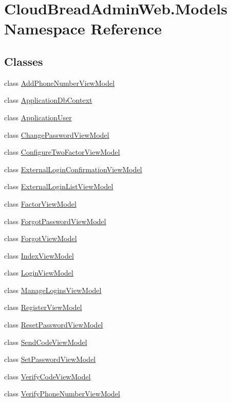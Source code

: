 \hypertarget{a00422}{}\section{Cloud\+Bread\+Admin\+Web.\+Models Namespace Reference}
\label{a00422}
\subsection*{Classes}
\begin{DoxyCompactItemize}
\item 
class \hyperlink{a00008}{Add\+Phone\+Number\+View\+Model}
\item 
class \hyperlink{a00016}{Application\+Db\+Context}
\item 
class \hyperlink{a00018}{Application\+User}
\item 
class \hyperlink{a00064}{Change\+Password\+View\+Model}
\item 
class \hyperlink{a00067}{Configure\+Two\+Factor\+View\+Model}
\item 
class \hyperlink{a00075}{External\+Login\+Confirmation\+View\+Model}
\item 
class \hyperlink{a00076}{External\+Login\+List\+View\+Model}
\item 
class \hyperlink{a00077}{Factor\+View\+Model}
\item 
class \hyperlink{a00079}{Forgot\+Password\+View\+Model}
\item 
class \hyperlink{a00080}{Forgot\+View\+Model}
\item 
class \hyperlink{a00090}{Index\+View\+Model}
\item 
class \hyperlink{a00131}{Login\+View\+Model}
\item 
class \hyperlink{a00134}{Manage\+Logins\+View\+Model}
\item 
class \hyperlink{a00172}{Register\+View\+Model}
\item 
class \hyperlink{a00173}{Reset\+Password\+View\+Model}
\item 
class \hyperlink{a00177}{Send\+Code\+View\+Model}
\item 
class \hyperlink{a00180}{Set\+Password\+View\+Model}
\item 
class \hyperlink{a00192}{Verify\+Code\+View\+Model}
\item 
class \hyperlink{a00193}{Verify\+Phone\+Number\+View\+Model}
\end{DoxyCompactItemize}
